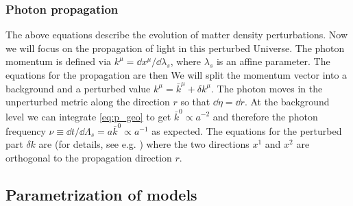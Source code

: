 \subsubsection{Photon propagation}
The above equations describe the evolution of matter density perturbations. Now we will focus on the propagation of light in this perturbed Universe. The photon momentum is defined via $k^\mu=\dd x^\mu/\dd\lambda_s$, where $\lambda_s$ is an affine parameter. The equations for the propagation are then
We will split the momentum vector into a background and a perturbed value $k^\mu=\bar k^\mu+\delta k^\mu$. The photon moves in the unperturbed metric along the direction $r$ so that $\dd\eta=\dd r$. At the background level we can integrate \autoref{eq:p_geo} to get $\bar k^0\propto a^{-2}$ and therefore the photon frequency $\nu\equiv\dd t/\dd\Lambda_s=a\bar k^0\propto a^{-1}$ as expected. The equations for the perturbed part $\delta k$ are (for details, see e.g. \cite{2010deto.book.....A})
where the two directions $x^1$ and $x^2$ are orthogonal to the propagation direction $r$.
\subsection{Parametrization of models}
